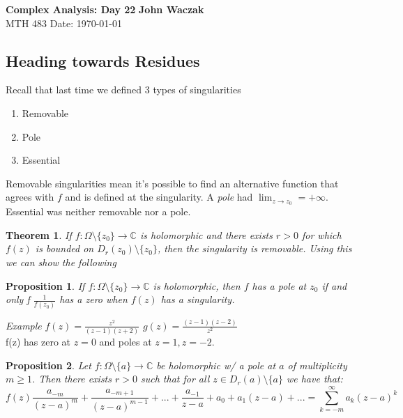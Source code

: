 \documentclass[a4paper, 11pt]{article}
\newtheorem*{theorem}{Theorem}
\newtheorem*{proposition}{Proposition}
\begin{document}
\noindent
\large\textbf{Complex Analysis: Day 22} \hfill \textbf{John Waczak} \\
\normalsize MTH 483 \hfill  Date: \today \\

\subsection*{Heading towards Residues} 
	Recall that last time we defined 3 types of singularities
		\begin{enumerate}
			\item Removable
			\item Pole 
			\item Essential
		\end{enumerate}
	\noindent Removable singularities mean it's possible to find an alternative function that agrees with $f$ and is defined at the singularity. A \textit{pole} had $\lim_{z\to z_0}=+\infty$. Essential was neither removable nor a pole.\\ 
	
	\begin{theorem}
		If $f:\Omega\setminus\{z_0\}\to\mathbb{C}$ is holomorphic and there exists $r>0$ for which $f(z)$ is bounded on $D_r(z_0)\setminus\{z_0\}$, then the singularity is removable. Using this we can show the following
	\end{theorem}
	
	\begin{proposition}
		If $f:\Omega\setminus\{z_0\}\to\mathbb{C}$ is holomorphic, then $f$ has a pole at $z_0$ if and only f $\frac{1}{f(z_0)}$ has a zero when $f(z)$ has a singularity. 
	\end{proposition}
	
	\noindent \textit{Example} $f(z) = \frac{z^2}{(z-1)(z+2)}$ $g(z) = \frac{(z-1)(z-2)}{z^2}$ \\ 
	f(z) has zero at $z=0$ and poles at $z=1, z=-2$. \\ 
	
	
	
	\begin{proposition}
		Let $f:\Omega\setminus\{a\}\to\mathbb{C}$ be holomorphic w/ a pole at $a$ of multiplicity $m\geq 1$. Then there exists $r>0$ such that for all $z\in D_r(a)\setminus\{a\}$ we have that:
			\begin{equation}
				f(z) \frac{a_{-m}}{(z-a)^m} + \frac{a_{-m+1}}{(z-a)^{m-1}}+...+\frac{a_{-1}}{z-a}+a_0+a_1(z-a)+... = \sum_{k=-m}^{\infty}a_k(z-a)^k 
			\end{equation}
	\end{proposition}
	
	
	
	
	
	
	
	
	
	
	
\end{document}
